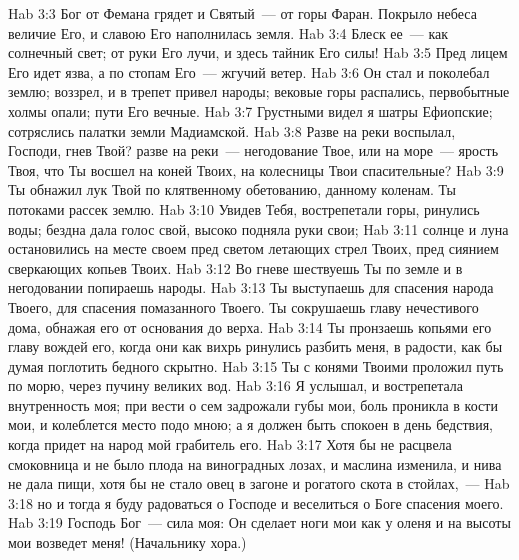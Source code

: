 \vs Hab 3:3 Бог от Фемана грядет и Святый~--- от горы Фаран. Покрыло небеса величие Его, и славою Его наполнилась земля.
\vs Hab 3:4 Блеск ее~--- как солнечный свет; от руки Его лучи, и здесь тайник Его силы!
\vs Hab 3:5 Пред лицем Его идет язва, а по стопам Его~--- жгучий ветер.
\vs Hab 3:6 Он стал и поколебал землю; воззрел, и в трепет привел народы; вековые горы распались, первобытные холмы опали; пути Его вечные.
\vs Hab 3:7 Грустными видел я шатры Ефиопские; сотряслись палатки земли Мадиамской.
\vs Hab 3:8 Разве на реки воспылал, Господи, гнев Твой? разве на реки~--- негодование Твое, или на море~--- ярость Твоя, что Ты восшел на коней Твоих, на колесницы Твои спасительные?
\vs Hab 3:9 Ты обнажил лук Твой по клятвенному обетованию, данному коленам. Ты потоками рассек землю.
\vs Hab 3:10 Увидев Тебя, вострепетали горы, ринулись воды; бездна дала голос свой, высоко подняла руки свои;
\vs Hab 3:11 солнце и луна остановились на месте своем пред светом летающих стрел Твоих, пред сиянием сверкающих копьев Твоих.
\vs Hab 3:12 Во гневе шествуешь Ты по земле и в негодовании попираешь народы.
\vs Hab 3:13 Ты выступаешь для спасения народа Твоего, для спасения помазанного Твоего. Ты сокрушаешь главу нечестивого дома, обнажая его от основания до верха.
\vs Hab 3:14 Ты пронзаешь копьями его главу вождей его, когда они как вихрь ринулись разбить меня, в радости, как бы думая поглотить бедного скрытно.
\vs Hab 3:15 Ты с конями Твоими проложил путь по морю, через пучину великих вод.
\vs Hab 3:16 Я услышал, и вострепетала внутренность моя; при вести о сем задрожали губы мои, боль проникла в кости мои, и колеблется место подо мною; а я должен быть спокоен в день бедствия, когда придет на народ мой грабитель его.
\vs Hab 3:17 Хотя бы не расцвела смоковница и не было плода на виноградных лозах, и маслина изменила, и нива не дала пищи, хотя бы не стало овец в загоне и рогатого скота в стойлах,~---
\vs Hab 3:18 но и тогда я буду радоваться о Господе и веселиться о Боге спасения моего.
\vs Hab 3:19 Господь Бог~--- сила моя: Он сделает ноги мои как у оленя и на высоты мои возведет меня! (Начальнику хора.)
